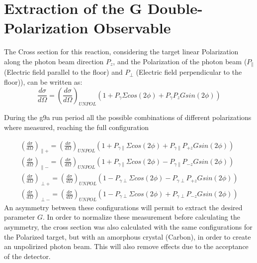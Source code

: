 \section{Extraction of the G Double-Polarization Observable}
The Cross section for this reaction, considering the target linear Polarization along the photon beam direction $P_z$, and the Polarization of the photon beam ($P_{\parallel}$ (Electric field parallel to the floor) and $P_{\perp}$ (Electric field perpendicular to the floor)), can be written as:
\begin{equation}
\frac{d\sigma}{d\Omega} = \left(\frac{d\sigma}{d\Omega}\right)_{UNPOL}  \left( 1 + P_{\gamma}\Sigma cos(2\phi) + P_{\gamma} P_z G sin(2\phi) \right)
\end{equation}

During the g9a run period all the possible combinations of different polarizations where measured, reaching the full configuration

\begin{eqnarray}
\left(\frac{d\sigma}{d\Omega}\right)_{\parallel +} = \left(\frac{d\sigma}{d\Omega}\right)_{UNPOL}  \left( 1 + P_{\gamma \parallel}\Sigma cos(2\phi) + P_{\gamma \parallel} P_{+z} G sin(2\phi) \right) \\
\left(\frac{d\sigma}{d\Omega}\right)_{\parallel -} = \left(\frac{d\sigma}{d\Omega}\right)_{UNPOL}  \left( 1 + P_{\gamma \parallel}\Sigma cos(2\phi) - P_{\gamma \parallel} P_{-z} G sin(2\phi) \right) \\
\left(\frac{d\sigma}{d\Omega}\right)_{\perp +} = \left(\frac{d\sigma}{d\Omega}\right)_{UNPOL}  \left( 1 - P_{\gamma \perp}\Sigma cos(2\phi) - P_{\gamma \perp} P_{+z} G sin(2\phi) \right) \\
\left(\frac{d\sigma}{d\Omega}\right)_{\perp -} = \left(\frac{d\sigma}{d\Omega}\right)_{UNPOL}  \left( 1 - P_{\gamma \perp}\Sigma cos(2\phi) + P_{\gamma \perp} P_{-z} G sin(2\phi) \right)
\end{eqnarray}
An asymmetry between these configurations will permit to extract the desired parameter $G$. In order to normalize these measurement before calculating the asymmetry, the cross section was also calculated with the same configurations for the Polarized target, but with an amorphous crystal (Carbon), in order to create an unpolirized photon beam. This will also remove effects due to the acceptance of the detector. 

